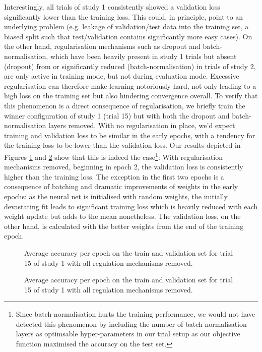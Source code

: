 \documentclass[british,12p]{article}
\begin{document}
   	  	Interestingly, all trials of study 1 consistently showed a validation loss significantly lower than the training loss. This could, in principle, point to an underlying problem (e.g. leakage of validation/test data into the training set, a biased split such that test/validation contains significantly more easy cases). On the other hand, regularisation mechanisms such as dropout and batch-normalisation, which have been heavily present in study 1 trials but absent (dropout) from or significantly reduced (batch-normalisation) in trials of study 2, are only active in training mode, but not during evaluation mode. Excessive regularisation can therefore make learning notoriously hard, not only leading to a high loss on the training set but also hindering convergence overall. To verify that this phenomenon is a direct consequence of regularisation, we briefly train the winner configuration of study 1 (trial 15) but with both the dropout and batch-normalisation layers removed. With no regularisation in place, we'd expect training and validation loss to be similar in the early epochs, with a tendency for the training loss to be lower than the validation loss. Our results depicted in Figures \ref{fig-trial-1-15-loss-noreg} and \ref{fig-trial-1-15-acc-noreg} show that this is indeed the case\footnote{Since batch-normalisation hurts the training performance, we would not have detected this phenomenon by including the number of batch-normalisation-layers as optimsable hyper-parameters in our trial setup as our objective function maximised the accuracy on the test set.}: With regularisation mechanisms removed, beginning in epoch 2, the validation loss is consistently higher than the training loss. The exception in the first two epochs is a consequence of batching and dramatic improvements of weights in the early epochs: as the neural net is initialised with random weights, the initially devastating fit leads to significant training loss which is heavily reduced with each weight update but adds to the mean nonetheless. The validation loss, on the other hand, is calculated with the better weights from the end of the training epoch.   	  	
   	  	
    \begin{figure}[h!]
		\begin{center}
  			\caption{Average accuracy per epoch on the train and validation set for trial 15 of study 1 with all regulation mechanisms removed.}
  			\label{fig-trial-1-15-loss-noreg}
  		\end{center}
	\end{figure}
   	\begin{figure}[h!]
		\begin{center}
  			\caption{Average accuracy per epoch on the train and validation set for trial 15 of study 1 with all regulation mechanisms removed.}
  			\label{fig-trial-1-15-acc-noreg}
  		\end{center}
	\end{figure}
\end{document}
